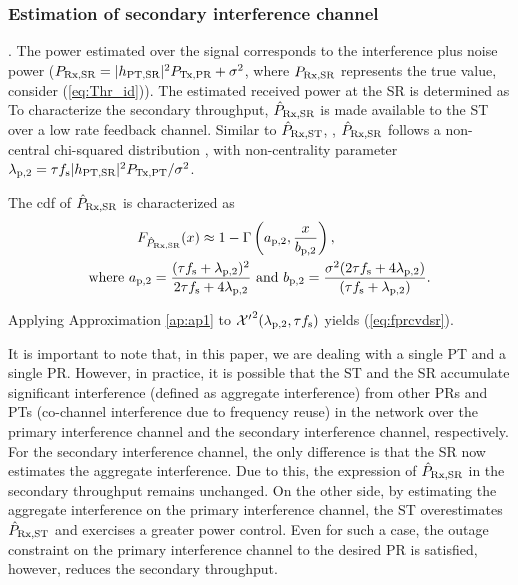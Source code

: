 \subsubsection{Estimation of secondary interference channel}
. The power estimated over the signal \tcg{$\gpt \cdot \sqrt{\ptranpt} \cdot \xtranpt[n] + \nasr[n]$} corresponds to the interference plus noise power ($P_{\text{Rx,SR}} = |h_{\text{PT,SR}}|^2 P_{\text{Tx,PR}} + \sigma^2$, where $P_{\text{Rx,SR}}$ represents the true value, consider (\ref{eq:Thr_id})). The estimated received power at the SR is determined as  To characterize the secondary throughput, $\hat{P}_{\text{Rx,SR}}$ is made available to the ST over a low rate feedback channel. Similar to $\hat{P}_{\text{Rx,ST}}$, , $\hat{P}_{\text{Rx,SR}}$ follows a non-central chi-squared distribution , with non-centrality parameter $\lambda_{\text{p,2}} = \tau f_{\text{s}} |h_{\text{PT,SR}}|^2 P_{\text{Tx,PT}} / \sigma^2$.
\begin{lemma} \label{lm:lm3}
\normalfont
The cdf of $\hat{P}_{\text{Rx,SR}}$ is characterized as 
\begin{align}
\fprcvdsr(x) \approx 1 - \Gamma&\left(\apt, \frac{x}{\bpt}\right) \label{eq:fprcvdsr}, \\ 
\text{where  } \apt = \frac{(\tau \fsam + \lpt)^2}{2 \tau \fsam + 4 \lpt} &\text{ and } \bpt = \frac{\nps (2 \tau \fsam + 4 \lpt)}{(\tau \fsam + \lpt)}.  \label{eq:para_pt} 
\end{align} 
\end{lemma}
\begin{IEEEproof}
Applying Approximation \ref{ap:ap1} to $\ncchi2(\lpt, \tau \fsam)$ yields (\ref{eq:fprcvdsr}). 
\end{IEEEproof}
It is important to note that, in this paper, we are dealing with a single PT and a single PR. However, in practice, it is possible that the ST and the SR accumulate significant interference (defined as aggregate interference) from other PRs and PTs (co-channel interference due to frequency reuse) in the network\cite{Elsawy13_cmag,Kaushik14_P} over the primary interference channel and the secondary interference channel, respectively. For the secondary interference channel, the only difference is that the SR now estimates the aggregate interference. Due to this, the expression of $\hat{P}_{\text{Rx,SR}}$ in the secondary throughput remains unchanged. On the other side, by estimating the aggregate interference on the primary interference channel, the ST overestimates $\hat{P}_{\text{Rx,ST}}$ and exercises a greater power control. Even for such a case, the outage constraint on the primary interference channel to the desired PR is satisfied, however, reduces the secondary throughput.  

